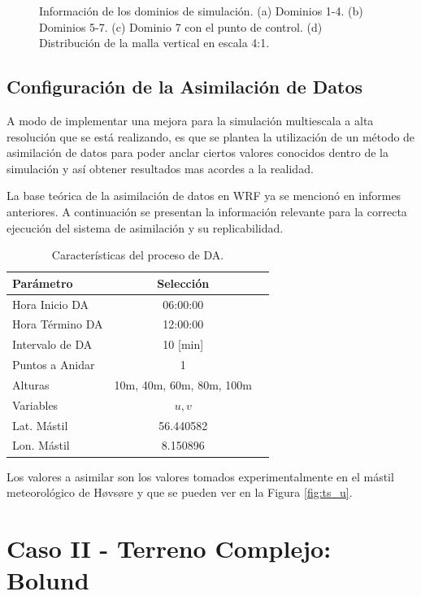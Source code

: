\begin{figure}[H]
	\caption{Información de los dominios de simulación. (a) Dominios 1-4. (b) Dominios 5-7. (c) Dominio 7 con el punto de control. (d) Distribución de la malla vertical en escala 4:1.}
	\label{fig:05_dom_hov}
\end{figure}

\subsection{Configuración de la Asimilación de Datos}
A modo de implementar una mejora para la simulación multiescala a alta resolución que se está realizando, es que se plantea la utilización de un método de asimilación de datos para poder anclar ciertos valores conocidos dentro de la simulación y así obtener resultados mas acordes a la realidad.

La base teórica de la asimilación de datos en WRF ya se mencionó en informes anteriores. A continuación se presentan la información relevante para la correcta ejecución del sistema de asimilación y su replicabilidad.

\begin{table}[h!]
	\caption{Características del proceso de DA.}\label{tab:05_config_da_hov}
	\centering\footnotesize
	\begin{tabular}{lcc}
		\toprule
		Parámetro & Selección \\
		\midrule
		Hora Inicio	DA 	 & 06:00:00   \\
		Hora Término DA	 		 & 12:00:00  \\
		Intervalo de DA	&	10 [min] \\
		Puntos a Anidar	 	 & 1   \\
		Alturas 	& 10m, 40m, 60m, 80m, 100m \\
		Variables	& $u,v$   \\
		Lat. Mástil	& 56.440582   \\
		Lon. Mástil	& 8.150896   \\
		
		\bottomrule
	\end{tabular}
\end{table}

Los valores a asimilar son los valores tomados experimentalmente en el mástil meteorológico de Høvsøre y que se pueden ver en la Figura \ref{fig:ts_u}.

\newpage
\section{Caso II - Terreno Complejo: Bolund}
